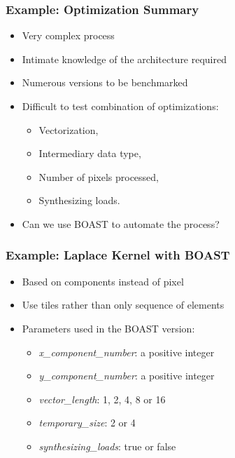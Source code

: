 \documentclass{beamer}
\begin{document}
\begin{frame}
  \frametitle{Example: Optimization Summary}
  \begin{itemize}
    \item Very complex process
    \item Intimate knowledge of the architecture required
    \item Numerous versions to be benchmarked
    \item Difficult to test combination of optimizations:
    \begin{itemize}
      \item Vectorization,
      \item Intermediary data type,
      \item Number of pixels processed,
      \item Synthesizing loads.
    \end{itemize}
    \item Can we use BOAST to automate the process?
  \end{itemize}
\end{frame}

\begin{frame}
  \frametitle{Example: Laplace Kernel with BOAST}
  \begin{itemize}
    \item Based on components instead of pixel
    \item Use tiles rather than only sequence of elements
    \item Parameters used in the BOAST version:
    \begin{itemize}
      \item \emph{x\_component\_number}: a positive integer
      \item \emph{y\_component\_number}: a positive integer
      \item \emph{vector\_length}: 1, 2, 4, 8 or 16
      \item \emph{temporary\_size}: 2 or 4
      \item \emph{synthesizing\_loads}: true or false
    \end{itemize}
  \end{itemize}
\end{frame}
\end{document}
